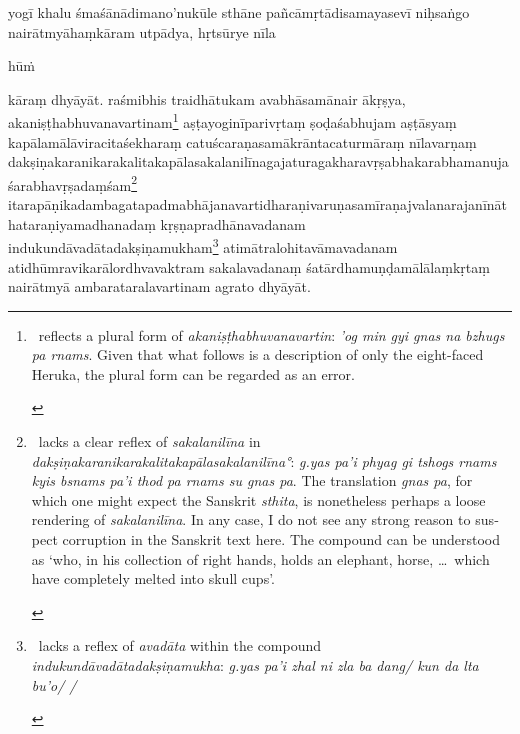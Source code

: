 \documentclass[naipra.tex]{subfiles}
\begin{document}
\begin{sanskrit}
\medskip\pstart
yogī khalu śmaśānādimano'nukūle sthāne pañcāmṛtādisamayasevī  niḥsaṅgo   nairātmyāhaṃkāram utpādya, hṛtsūrye nīla\dsh \begin{mantra}hūṁ\end{mantra}\dsh kāraṃ dhyāyāt. 
 raśmibhis traidhātukam avabhāsamānair ākṛṣya, akaniṣṭhabhuvanavartinam\footnote{\begin{english}
	\TIB\ reflects a plural form of \emph{akaniṣṭhabhuvanavartin}: \emph{'og min gyi gnas na bzhugs pa rnams}.
	Given that what follows is a description of only the eight-faced Heruka, the plural form can be regarded as an error.
\end{english}} aṣṭayoginīparivṛtaṃ ṣoḍaśabhujam aṣṭāsyaṃ kapālamālāviracitaśekharaṃ catuścaraṇasamākrāntacaturmāraṃ nīlavarṇaṃ dakṣiṇakaranikarakalitakapālasakalanilīnagaja\dsh turaga\dsh khara\dsh vṛṣabha\dsh karabha\dsh manuja\dsh śarabha\dsh vṛṣadaṃśam\footnote{\begin{english}
	\TIB\ lacks a clear reflex of \emph{sakalanilīna} in \emph{dakṣiṇakaranikarakalitakapālasakalanilīna°}: \emph{g.yas pa'i phyag gi tshogs rnams kyis bsnams pa'i thod pa rnams su gnas pa}.
	The translation \emph{gnas pa}, for which one might expect the Sanskrit \emph{sthita}, is nonetheless perhaps a loose rendering of \emph{sakalanilīna}.
	In any case, I do not see any strong reason to suspect corruption in the Sanskrit text here.
	The compound can be understood as `who, in his collection of right hands, holds an elephant, horse, \ldots\ which have completely melted into skull cups'. 
\end{english}} itarapāṇikadambagatapadmabhājanavartidharaṇi\dsh varuṇa\dsh samīraṇa\dsh jvalana\dsh rajanīnātha\dsh taraṇi\dsh yama\dsh dhanadaṃ kṛṣṇapradhānavadanam indukundāvadātadakṣiṇamukham\footnote{\begin{english}
	\TIB\ lacks a reflex of \emph{avadāta} within the compound \emph{indukundāvadātadakṣiṇamukha}: \emph{g.yas pa'i zhal ni zla ba dang/ kun da lta bu'o/ /}
\end{english}} atimātralohitavāmavadanam atidhūmravikarālordhvavaktram sakalavadanaṃ śatārdhamuṇḍamālālaṃkṛtaṃ nairātmyā ambarataralavartinam agrato dhyāyāt. 
\pend



\end{sanskrit}
\end{document}
